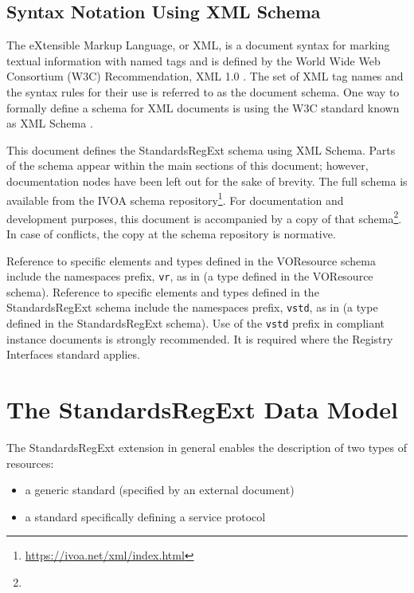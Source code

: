 \documentclass[11pt,a4paper]{ivoa}
\begin{document}
\subsection{Syntax Notation Using XML Schema}
The eXtensible Markup Language, or XML, is a document syntax for marking
textual information with named tags and is defined by the
World Wide Web Consortium (W3C) Recommendation,
XML 1.0 \citep{std:XML}.
The set of XML tag names and the syntax
rules for their use is referred to as the document schema.  One way to
formally define a schema for XML documents is using the W3C standard
known as XML Schema \citep{std:XSD}.


This document defines the StandardsRegExt schema using XML Schema.
Parts of the schema appear within the main sections of this document;
however, documentation nodes have been left out for the sake of brevity.
The full schema is available from the IVOA schema
repository\footnote{\url{https://ivoa.net/xml/index.html}}.  For
documentation and development purposes, this document is accompanied by
a copy of that
schema\footnote{}.  In case of
conflicts, the copy at the schema repository is normative.

Reference to specific elements and types defined in the VOResource
schema include the namespaces prefix, \texttt{vr}, as in
 (a type defined in the VOResource schema).
Reference to specific elements and types defined in the StandardsRegExt
schema include the namespaces prefix, \texttt{vstd}, as in
 (a type defined in the StandardsRegExt schema).
Use of the \texttt{vstd} prefix in compliant instance documents is
strongly recommended.  It is required where the Registry Interfaces
standard \citep{2018ivoa.spec.0723D} applies.




\section{The StandardsRegExt Data Model}

The StandardsRegExt extension in general enables the description of two
types of resources:

\begin{itemize}
\item  a generic standard (specified by an external document)
\item  a standard specifically defining a service protocol
\end{itemize}
\end{document}
